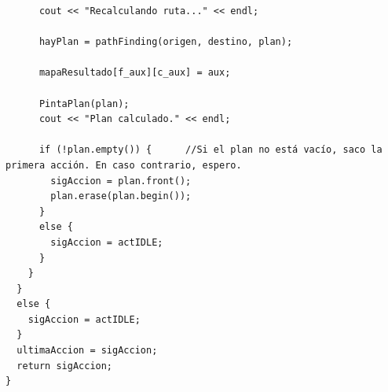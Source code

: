 \documentclass[12pt,spanish]{article}
\begin{document}
\begin{verbatim}
      cout << "Recalculando ruta..." << endl;

      hayPlan = pathFinding(origen, destino, plan);
      
      mapaResultado[f_aux][c_aux] = aux;

      PintaPlan(plan);
      cout << "Plan calculado." << endl;

      if (!plan.empty()) {      //Si el plan no está vacío, saco la primera acción. En caso contrario, espero.
        sigAccion = plan.front();
        plan.erase(plan.begin());
      }
      else {
        sigAccion = actIDLE;
      }
    }
  }
  else {
    sigAccion = actIDLE;
  }
  ultimaAccion = sigAccion;
  return sigAccion;
}

\end{verbatim}
\end{document}
